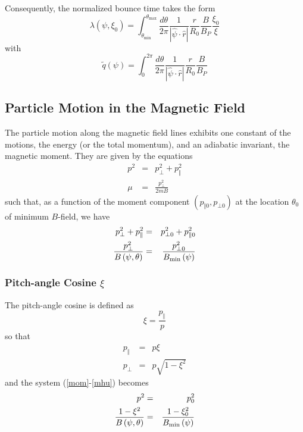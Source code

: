 \documentclass{article}
\begin{document}
Consequently, the normalized bounce time takes the form 
\begin{equation}
\lambda \left( \psi ,\xi _{0}\right) =\int_{\theta _{\min }}^{\theta _{\max
}}\frac{d\theta }{2\pi }\frac{1}{\left| \widehat{\psi }\cdot \widehat{r}%
\right| }\frac{r}{R_{0}}\frac{B}{B_{P}}\frac{\xi _{0}}{\xi }  \label{lambda}
\end{equation}
with
\begin{equation}
\widetilde{q}\left( \psi \right) =\int_{0}^{2\pi }\frac{d\theta }{2\pi }%
\frac{1}{\left| \widehat{\psi }\cdot \widehat{r}\right| }\frac{r}{R_{0}}%
\frac{B}{B_{P}}  \label{qtilde}
\end{equation}

\subsection{Particle Motion in the Magnetic Field}

The particle motion along the magnetic field lines exhibits one constant of
the motions, the energy (or the total momentum), and an adiabatic invariant,
the magnetic moment. They are given by the equations 
\begin{eqnarray}
p^{2} &=&p_{\bot }^{2}+p_{\Vert }^{2} \\
\mu &=&\frac{p_{\bot }^{2}}{2mB}
\end{eqnarray}
such that, as a function of the moment component $\left( p_{\Vert 0},p_{\bot
0}\right) $ at the location $\theta _{0}$ of minimum $B$-field, we have 
\begin{eqnarray}
p_{\bot }^{2}+p_{\Vert }^{2} &=&p_{\bot 0}^{2}+p_{\Vert 0}^{2}  \label{mom}
\\
\frac{p_{\bot }^{2}}{B\left( \psi ,\theta \right) } &=&\frac{p_{\bot 0}^{2}}{%
B_{\min }\left( \psi \right) }  \label{mhu}
\end{eqnarray}

\subsubsection{Pitch-angle Cosine $\xi $}

The pitch-angle cosine is defined as 
\[
\xi =\frac{p_{\Vert }}{p} 
\]
so that 
\begin{eqnarray*}
p_{\Vert } &=&p\xi \\
p_{\bot } &=&p\sqrt{1-\xi ^{2}}
\end{eqnarray*}
and the system (\ref{mom}-\ref{mhu}) becomes 
\begin{eqnarray}
p^{2} &=&p_{0}^{2} \\
\frac{1-\xi ^{2}}{B\left( \psi ,\theta \right) } &=&\frac{1-\xi _{0}^{2}}{%
B_{\min }\left( \psi \right) }
\end{eqnarray}
\end{document}
